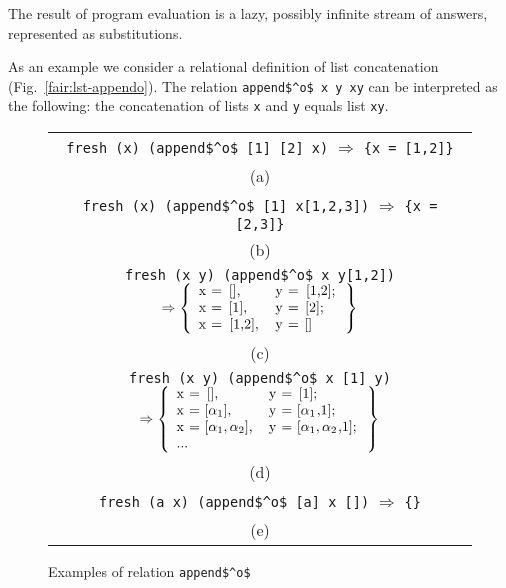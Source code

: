 The result of \mk program evaluation is a lazy, possibly infinite stream of answers, represented as substitutions.

As an example we consider a relational definition of list concatenation (Fig.~\ref{fair:lst-appendo}). The relation \lstinline|append$^o$ x y xy| can be interpreted as the following:
the concatenation of lists \lstinline|x| and \lstinline|y| equals list \lstinline|xy|.

\begin{figure*} %
\centering
\begin{tabular}{c}
\lstinline|fresh (x) (append$^o$ [1] [2] x)| $\Rightarrow$ \lstinline|{x = [1,2]}| \\
(a) \\[5mm]
\lstinline|fresh (x) (append$^o$ [1] x[1,2,3])| \!$\Rightarrow$ \lstinline|{x = [2,3]}|\\
(b) \\[5mm]
\lstinline|fresh (x y) (append$^o$ x y[1,2])| $\Rightarrow \left\{
\begin{array}{ll}
\mbox{\lstinline{x = [],}}    & \mbox{\lstinline{y = [1,2];}} \\
\mbox{\lstinline{x = [1],}}   & \mbox{\lstinline{y = [2];}} \\
\mbox{\lstinline{x = [1,2],}} & \mbox{\lstinline{y = []}} \\
\end{array} \right\}$ \\
(c) \\[5mm]
\lstinline|fresh (x y) (append$^o$ x [1] y)| $\Rightarrow \left\{
\begin{array}{ll}
\mbox{\lstinline{x = [],}}    & \mbox{\lstinline{y = [1];}} \\
\mbox{\lstinline{x = [}} \alpha_1\! \mbox{\lstinline{],}} & \mbox{\lstinline{y = [}} \alpha_1\! \mbox{\lstinline{,1];}} \\
\mbox{\lstinline{x = [}} \alpha_1, \alpha_2\! \mbox{\lstinline{],}} & \mbox{\lstinline{y = [}} \alpha_1, \alpha_2\! \mbox{\lstinline{,1];}} \\
...
\end{array} \right\}$ \\
(d)\\[5mm]
\lstinline|fresh (a x) (append$^o$ [a] x [])| $\Rightarrow$ \lstinline|{}|\\
(e) 
\end{tabular}
\caption{Examples of relation \lstinline|append$^o$|}
\label{fair:appendo-examples}
\end{figure*}

